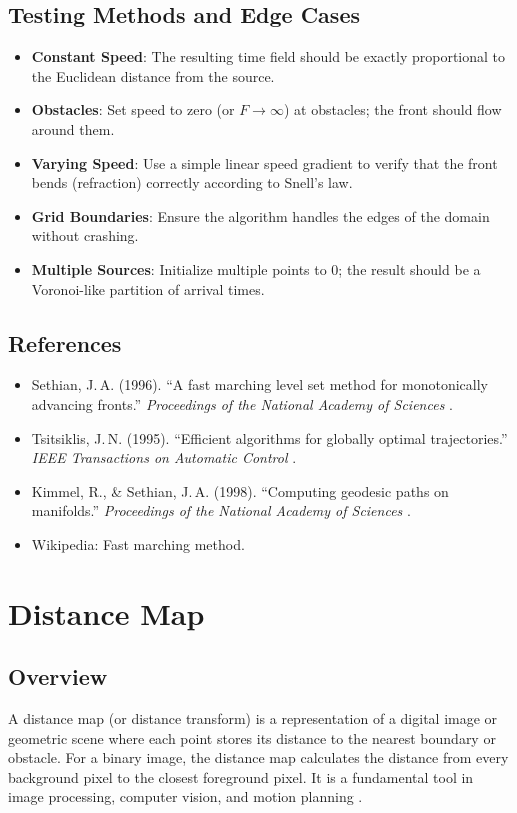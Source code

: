 \subsection{Testing Methods and Edge Cases}
\begin{itemize}
  \item \textbf{Constant Speed}: The resulting time field should be exactly proportional to the Euclidean distance from the source.
  \item \textbf{Obstacles}: Set speed to zero (or $F \to \infty$) at obstacles; the front should flow around them.
  \item \textbf{Varying Speed}: Use a simple linear speed gradient to verify that the front bends (refraction) correctly according to Snell's law.
  \item \textbf{Grid Boundaries}: Ensure the algorithm handles the edges of the domain without crashing.
  \item \textbf{Multiple Sources}: Initialize multiple points to 0; the result should be a Voronoi-like partition of arrival times.
\end{itemize}

\subsection{References}
\begin{itemize}
  \item Sethian, J.\,A. (1996). ``A fast marching level set method for monotonically advancing fronts.'' \textit{Proceedings of the National Academy of Sciences} \cite{sethian1996}.
  \item Tsitsiklis, J.\,N. (1995). ``Efficient algorithms for globally optimal trajectories.'' \textit{IEEE Transactions on Automatic Control} \cite{tsitsiklis1995}.
  \item Kimmel, R., \& Sethian, J.\,A. (1998). ``Computing geodesic paths on manifolds.'' \textit{Proceedings of the National Academy of Sciences} \cite{kimmel1998}.
  \item Wikipedia: Fast marching method.
\end{itemize}

\section{Distance Map}
\label{sec:distance_map}

\subsection{Overview}
A distance map (or distance transform) is a representation of a digital image or geometric scene where each point stores its distance to the nearest boundary or obstacle. For a binary image, the distance map calculates the distance from every background pixel to the closest foreground pixel. It is a fundamental tool in image processing, computer vision, and motion planning \cite{rosenfeld1966}.

